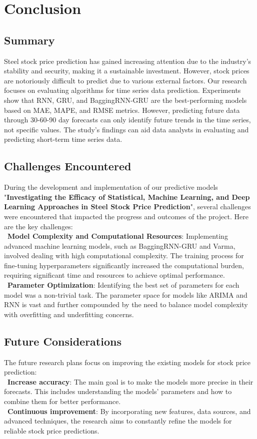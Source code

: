 \documentclass{ieeeojies}
\begin{document}
\section{Conclusion}
\subsection{Summary}
Steel stock price prediction has gained increasing attention due to the industry's stability and security, making it a sustainable investment. However, stock prices are notoriously difficult to predict due to various external factors. Our research focuses on evaluating algorithms for time series data prediction. Experiments show that RNN, GRU, and BaggingRNN-GRU are the best-performing models based on MAE, MAPE, and RMSE metrics. However, predicting future data through 30-60-90 day forecasts can only identify future trends in the time series, not specific values. The study's findings can aid data analysts in evaluating and predicting short-term time series data.
\subsection{Challenges Encountered}
During the development and implementation of our predictive models "\textbf{Investigating the Efficacy of Statistical, Machine Learning, and Deep Learning
Approaches in Steel Stock Price Prediction}", several challenges were encountered that impacted the progress and outcomes of the project. Here are the key challenges:\\
\indent\textbullet\ \textbf {Model Complexity and Computational Resources}:
Implementing advanced machine learning models, such as BaggingRNN-GRU and Varma, involved dealing with high computational complexity. The training process for fine-tuning hyperparameters significantly increased the computational burden, requiring significant time and resources to achieve optimal performance.\\
\indent\textbullet\ \textbf{Parameter Optimization}:
Identifying the best set of parameters for each model was a non-trivial task. The parameter space for models like ARIMA and RNN is vast and further compounded by the need to balance model complexity with overfitting and underfitting concerns.
\subsection{Future Considerations}
The future research plans focus on improving the existing models for stock price prediction:\\
\indent\textbullet\ \textbf{Increase accuracy}: The main goal is to make the models more precise in their forecasts. This includes understanding the models' parameters and how to combine them for better performance.\\
\indent\textbullet\ \textbf{Continuous improvement}: By incorporating new features, data sources, and advanced techniques, the research aims to constantly refine the models for reliable stock price predictions.
\end{document}
